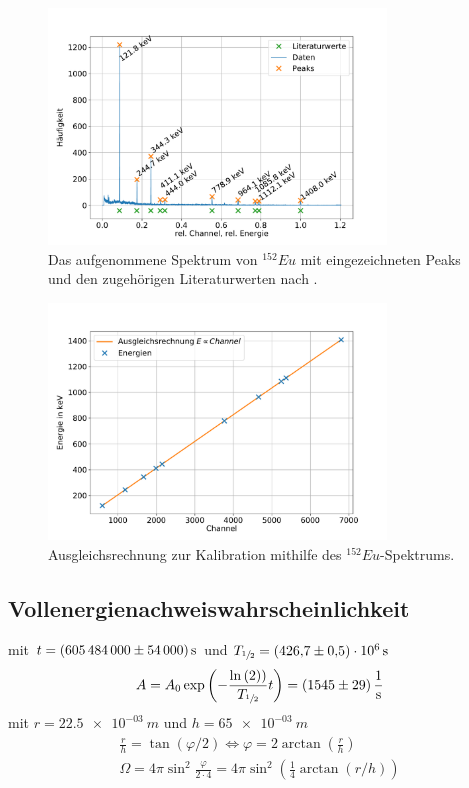 \begin{figure}[h!]
  \centering
  \includegraphics[width=0.8\textwidth]{content/images/spektrum_europium_kali.pdf}
  \caption{Das aufgenommene Spektrum von $^{152}Eu$ mit eingezeichneten Peaks und den zugehörigen Literaturwerten nach %
  .}
  \label{fig:eu_spect_kali}
\end{figure}

\begin{figure}[h!]
  \centering
  \includegraphics[width=0.8\textwidth]{content/images/kalibration.pdf}
  \caption{Ausgleichsrechnung zur Kalibration mithilfe des $^{152}Eu$-Spektrums.}
  \label{fig:kali}
\end{figure}


\subsection{Vollenergienachweiswahrscheinlichkeit}
mit $t = \SI{605484000 (54000)}{s}$
und $T_{\sfrac{1}{2}} = \SI{426.7 (5) e+06}{s}$ %
\begin{equation*}
	A = A_{0} \exp{\left( - \frac{\ln{(2))}}{T_{\sfrac{1}{2}}} t \right)} = \SI{1545 (29)}{\per \second}
\end{equation*}
mit $r=\SI{22.5e-03}{m}$
und $h = \SI{65e-03}{m}$
\begin{align*}
	\frac{r}{h} = \tan{( \varphi / 2 )} \Leftrightarrow \varphi = 2 \arctan{(\frac{r}{h})} \\
	\Omega = 4 \pi \sin^2{\frac{\varphi}{2 \cdot 4}} = 4 \pi \sin^2{ \left( \frac{1}{4} \arctan{(r/h)} \right)}
\end{align*}
